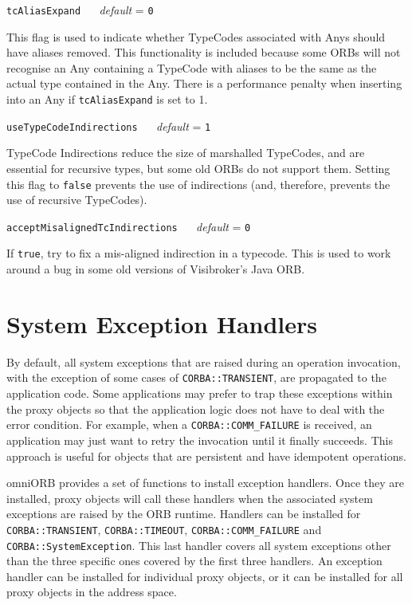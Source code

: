 \documentclass[11pt,oneside,a4paper]{book}
\makeatletter
\newcommand{\code}[1]{\texttt{#1}}
\newcommand{\confopt}[2]
  {\vspace{\baselineskip}\par\noindent\code{#1} ~~ \textit{default} =
   \code{#2}}
\renewcommand{\confopt}[2]
  {\vspace{\baselineskip}\par\noindent\code{#1} ~~ \textit{default} =
   \code{#2}\\[-1ex]\@afterheading}
\newcommand{\dsc}{\discretionary{}{}{}}
\makeatother
\begin{document}
\confopt{tcAliasExpand}{0}

This flag is used to indicate whether TypeCodes associated with Anys
should have aliases removed. This functionality is included because
some ORBs will not recognise an Any containing a TypeCode with aliases
to be the same as the actual type contained in the Any. There is a
performance penalty when inserting into an Any if \code{tcAliasExpand}
is set to 1.


\confopt{useTypeCodeIndirections}{1}

TypeCode Indirections reduce the size of marshalled TypeCodes, and are
essential for recursive types, but some old ORBs do not support them.
Setting this flag to \code{false} prevents the use of indirections
(and, therefore, prevents the use of recursive TypeCodes).


\confopt{acceptMisalignedTcIndirections}{0}

If \code{true}, try to fix a mis-aligned indirection in a
typecode. This is used to work around a bug in some old versions of
Visibroker's Java ORB.


\vspace{2\baselineskip}


\section{System Exception Handlers}

By default, all system exceptions that are raised during an operation
invocation, with the exception of some cases of
\code{CORBA::TRANSIENT}, are propagated to the application code. Some
applications may prefer to trap these exceptions within the proxy
objects so that the application logic does not have to deal with the
error condition. For example, when a \code{CORBA::COMM\_FAILURE} is
received, an application may just want to retry the invocation until
it finally succeeds. This approach is useful for objects that are
persistent and have idempotent operations.

omniORB provides a set of functions to install exception handlers.
Once they are installed, proxy objects will call these handlers when
the associated system exceptions are raised by the ORB runtime.
Handlers can be installed for \code{CORBA::\dsc{}TRANSIENT},
\code{CORBA::\dsc{}TIMEOUT}, \code{CORBA::COMM\_FAILURE} and
\code{CORBA::\dsc{}SystemException}.  This last handler covers all
system exceptions other than the three specific ones covered by the
first three handlers. An exception handler can be installed for
individual proxy objects, or it can be installed for all proxy objects
in the address space.
\end{document}
